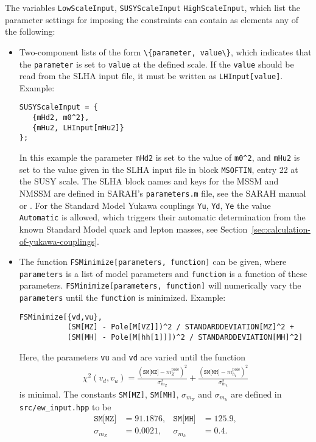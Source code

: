 \documentclass[final,3p,11pt,pdflatex]{elsarticle}
\newcommand{\code}[1]{\lstinline|#1|}  %
\newcommand{\pole}{\text{pole}}
\newcommand{\secref}[1]{Section~\ref{#1}}
\begin{document}
%
The variables \code{LowScaleInput}, \code{SUSYScaleInput}
\code{HighScaleInput}, which list the parameter settings for imposing
the constraints can contain as elements any of the following:
%
\begin{itemize}
\item Two-component lists of the form \code{\{parameter, value\}},
  which indicates that the \code{parameter} is set to \code{value} at
  the defined scale.  If the \code{value} should be read from the SLHA
  input file, it must be written as \code{LHInput[value]}.  Example:
  \begin{lstlisting}
SUSYScaleInput = {
   {mHd2, m0^2},
   {mHu2, LHInput[mHu2]}
};
  \end{lstlisting}
  In this example the parameter \code{mHd2} is set to the value of
  \code{m0^2}, and \code{mHu2} is set to the value given in the SLHA
  input file in block \code{MSOFTIN}, entry 22 at the SUSY scale.  The
  SLHA block names and keys for the MSSM and NMSSM are defined in
  SARAH's \code{parameters.m} file, see the SARAH manual or
  \cite{Staub:2010jh}.  For the Standard Model Yukawa couplings
  \code{Yu}, \code{Yd}, \code{Ye} the value \code{Automatic} is
  allowed, which triggers their automatic determination from the known
  Standard Model quark and lepton masses, see
  \secref{sec:calculation-of-yukawa-couplings}.

\item The function \code{FSMinimize[parameters, function]} can be
  given, where \code{parameters} is a list of model parameters and
  \code{function} is a function of these parameters.
  \code{FSMinimize[parameters, function]} will numerically vary the
  \code{parameters} until the \code{function} is minimized.  Example:
  \begin{lstlisting}
FSMinimize[{vd,vu},
           (SM[MZ] - Pole[M[VZ]])^2 / STANDARDDEVIATION[MZ]^2 +
           (SM[MH] - Pole[M[hh[1]]])^2 / STANDARDDEVIATION[MH]^2]
  \end{lstlisting}
  Here, the parameters \code{vu} and \code{vd} are varied until the
  function
  \begin{align}
    \chi^2(v_d,v_u) =
    \frac{(\texttt{SM[MZ]}-m_Z^\pole)^2}{\sigma_{m_Z}^2} +
    \frac{(\texttt{SM[MH]}-m_{h_1}^\pole)^2}{\sigma_{m_h}^2}
  \end{align}
  is minimal.  The constants \code{SM[MZ]}, \code{SM[MH]},
  $\sigma_{m_Z}$ and $\sigma_{m_h}$ are defined in
  \code{src/ew_input.hpp} to be
  \begin{align}
    \texttt{SM[MZ]} &= 91.1876, &
    \texttt{SM[MH]} &= 125.9, \\
    \sigma_{m_Z} &= 0.0021, &
    \sigma_{m_h} &= 0.4 .
  \end{align}


\end{itemize}
\end{document}
